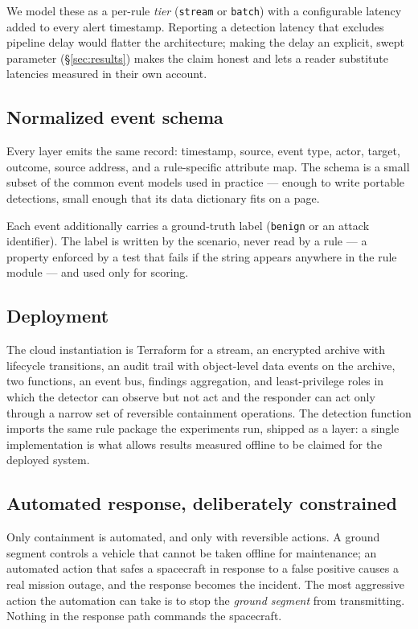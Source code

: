 We model these as a per-rule \emph{tier} (\texttt{stream} or \texttt{batch}) with
a configurable latency added to every alert timestamp. Reporting a detection
latency that excludes pipeline delay would flatter the architecture; making the
delay an explicit, swept parameter (\S\ref{sec:results}) makes the claim honest
and lets a reader substitute latencies measured in their own account.

\subsection{Normalized event schema}

Every layer emits the same record: timestamp, source, event type, actor, target,
outcome, source address, and a rule-specific attribute map. The schema is a small
subset of the common event models used in practice --- enough to write portable
detections, small enough that its data dictionary fits on a page.

Each event additionally carries a ground-truth label (\texttt{benign} or an attack
identifier). The label is written by the scenario, never read by a rule --- a
property enforced by a test that fails if the string appears anywhere in the rule
module --- and used only for scoring.

\subsection{Deployment}

The cloud instantiation is Terraform for a stream, an encrypted archive with
lifecycle transitions, an audit trail with object-level data events on the
archive, two functions, an event bus, findings aggregation, and least-privilege
roles in which the detector can observe but not act and the responder can act
only through a narrow set of reversible containment operations. The detection
function imports the same rule package the experiments run, shipped as a layer:
a single implementation is what allows results measured offline to be claimed for
the deployed system.

\subsection{Automated response, deliberately constrained}

Only containment is automated, and only with reversible actions. A ground segment
controls a vehicle that cannot be taken offline for maintenance; an automated
action that safes a spacecraft in response to a false positive causes a real
mission outage, and the response becomes the incident. The most aggressive action
the automation can take is to stop the \emph{ground segment} from transmitting.
Nothing in the response path commands the spacecraft.
